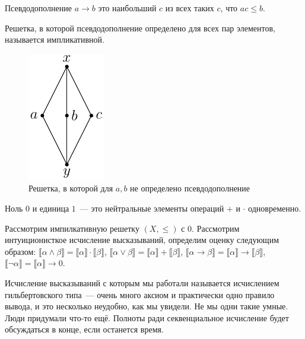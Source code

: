 \begin{definition}
    Псевдодополнение $a\to b$ это наибольший $c$ из всех таких $c$, что $ac \leqslant b$.

    Решетка, в которой псевдодополнение определено для всех пар элементов, называется импликативной.
\end{definition}

\begin{figure}
    \begin{center}
        \includegraphics{img/diamont.pdf}
        \caption{Решетка, в которой для $a,b$ не определено псевдодополнение}
    \end{center}
\end{figure}

\begin{definition}
Ноль $0$ и единица $1$~--- это нейтральные элементы операций $+$ и $\cdot$ одновременно.     
\end{definition}

\begin{theorem}
    Рассмотрим импилкативную решетку $(X, \leqslant)$ с 0.
    Рассмотрим интуиционисткое исчисление высказываний, определим оценку следующим образом: 
    $\llbracket \alpha \land \beta \rrbracket = \llbracket \alpha \rrbracket \cdot \llbracket \beta \rrbracket$, $\llbracket \alpha \lor \beta \rrbracket = \llbracket \alpha \rrbracket + \llbracket \beta \rrbracket$, $\llbracket \alpha \to \beta \rrbracket = \llbracket \alpha \rrbracket \to \llbracket \beta \rrbracket$, $\llbracket \neg \alpha \rrbracket = \llbracket \alpha \rrbracket \to 0$.
\end{theorem}

Исчисление высказываний с которым мы работали называется исчислением  гильбертовского типа~--- очень много аксиом и практически одно правило вывода, и это несколько неудобно, как мы увидели.
Не мы одни такие умные. 
Люди придумали что-то ещё.
Полноты ради секвенциальное исчисление будет обсуждаться в конце, если останется время.

